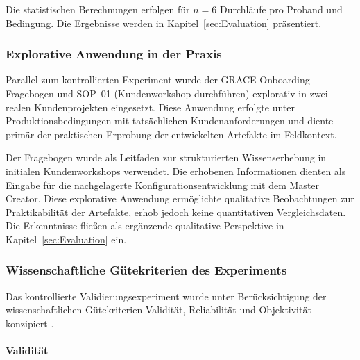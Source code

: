 \noindent Die statistischen Berechnungen erfolgen für $n = 6$ Durchläufe pro Proband und Bedingung. Die Ergebnisse werden in Kapitel~\ref{sec:Evaluation} präsentiert.

\subsubsection{Explorative Anwendung in der Praxis}
\label{subsubsec:ExplorativeAnwendung}

Parallel zum kontrollierten Experiment wurde der GRACE Onboarding Fragebogen und SOP~01 (Kundenworkshop durchführen) explorativ in zwei realen Kundenprojekten eingesetzt. Diese Anwendung erfolgte unter Produktionsbedingungen mit tatsächlichen Kundenanforderungen und diente primär der praktischen Erprobung der entwickelten Artefakte im Feldkontext.

\noindent Der Fragebogen wurde als Leitfaden zur strukturierten Wissenserhebung in initialen Kundenworkshops verwendet. Die erhobenen Informationen dienten als Eingabe für die nachgelagerte Konfigurationsentwicklung mit dem Master Creator. Diese explorative Anwendung ermöglichte qualitative Beobachtungen zur Praktikabilität der Artefakte, erhob jedoch keine quantitativen Vergleichsdaten. Die Erkenntnisse fließen als ergänzende qualitative Perspektive in Kapitel~\ref{sec:Evaluation} ein.

\subsubsection{Wissenschaftliche Gütekriterien des Experiments}
\label{subsubsec:Guetekriterien}

Das kontrollierte Validierungsexperiment wurde unter Berücksichtigung der wissenschaftlichen Gütekriterien Validität, Reliabilität und Objektivität konzipiert \citep{gothesis:methodikteil}.

\paragraph{Validität}

